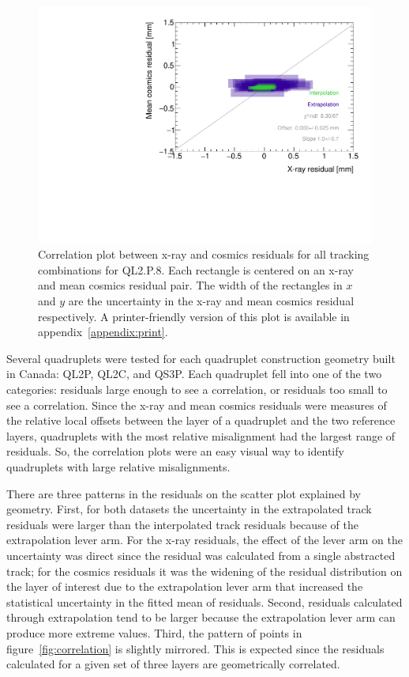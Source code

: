 \begin{figure}
    \centering
    \includegraphics[width = \textwidth]{figures/figure_QL2P08_3100V_2021-08-16_QL2P08_local_cosmic_and_xray_data_correlation_plot.pdf}
    \caption{Correlation plot between x-ray and cosmics residuals for all tracking combinations for QL2.P.8. Each rectangle is centered on an x-ray and mean cosmics residual pair. The width of the rectangles in $x$ and $y$ are the uncertainty in the x-ray and mean cosmics residual respectively. A printer-friendly version of this plot is available in appendix~\ref{appendix:print}.}
    \label{fig:no_correlation}
\end{figure}

Several quadruplets were tested for each quadruplet construction geometry built in Canada: QL2P, QL2C, and QS3P. Each quadruplet fell into one of the two categories: residuals large enough to see a correlation, or residuals too small to see a correlation. Since the x-ray and mean cosmics residuals were measures of the relative local offsets between the layer of a quadruplet and the two reference layers, quadruplets with the most relative misalignment had the largest range of residuals. So, the correlation plots were an easy visual way to identify quadruplets with large relative misalignments.

There are three patterns in the residuals on the scatter plot explained by geometry. First, for both datasets the uncertainty in the extrapolated track residuals were larger than the interpolated track residuals because of the extrapolation lever arm. For the x-ray residuals, the effect of the lever arm on the uncertainty was direct since the residual was calculated from a single abstracted track; for the cosmics residuals it was the widening of the residual distribution on the layer of interest due to the extrapolation lever arm that increased the statistical uncertainty in the fitted mean of residuals. Second, residuals calculated through extrapolation tend to be larger because the extrapolation lever arm can produce more extreme values. Third, the pattern of points in figure~\ref{fig:correlation} is slightly mirrored. This is expected since the residuals calculated for a given set of three layers are geometrically correlated. 

